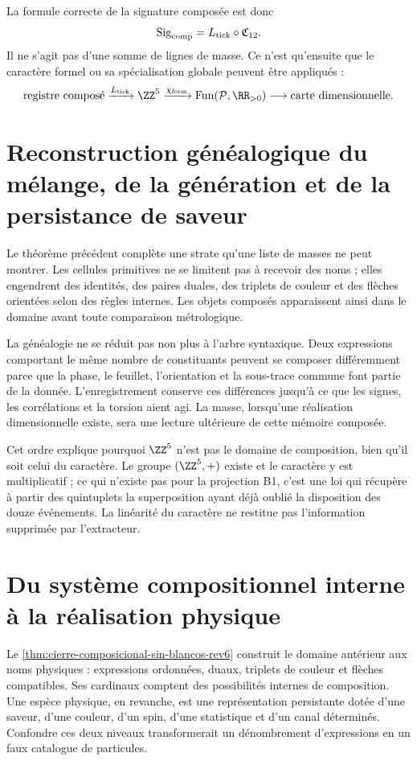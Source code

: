 La formule correcte de la signature composée est donc
\[
 \operatorname{Sig}_{\rm comp}
 =
 L_{\rm tick}\circ\mathfrak C_{12}.
\]
Il ne s’agit pas d’une somme de lignes de masse. Ce n’est qu’ensuite que le caractère formel ou sa spécialisation globale peuvent être appliqués :
\[
 \text{registre composé}
 \xrightarrow{L_{\rm tick}}\ZZ^5
 \xrightarrow{\chi_{\rm form}}\operatorname{Fun}(\mathcal P,\RR_{>0})
 \longrightarrow
 \text{carte dimensionnelle}.
\]

\section{Reconstruction généalogique du mélange, de la génération et de la persistance de saveur}
\label{sec:significado-genealogico-composicion-rev6}

Le théorème précédent complète une strate qu’une liste de masses ne peut montrer. Les cellules primitives ne se limitent pas à recevoir des noms ; elles engendrent des identités, des paires duales, des triplets de couleur et des flèches orientées selon des règles internes. Les objets composés apparaissent ainsi dans le domaine avant toute comparaison métrologique.

La généalogie ne se réduit pas non plus à l’arbre syntaxique. Deux expressions comportant le même nombre de constituants peuvent se composer différemment parce que la phase, le feuillet, l’orientation et la sous-trace commune font partie de la donnée. L’enregistrement conserve ces différences jusqu’à ce que les signes, les corrélations et la torsion aient agi. La masse, lorsqu’une réalisation dimensionnelle existe, sera une lecture ultérieure de cette mémoire composée.

Cet ordre explique pourquoi \(\ZZ^5\) n’est pas le domaine de composition, bien qu’il soit celui du caractère. Le groupe \((\ZZ^5,+)\) existe et le caractère y est multiplicatif ; ce qui n’existe pas pour la projection B1, c’est une loi qui récupère à partir des quintuplets la superposition ayant déjà oublié la disposition des douze événements. La linéarité du caractère ne restitue pas l’information supprimée par l’extracteur.

\section{Du système compositionnel interne à la réalisation physique}
\label{sec:delimitacion-composicion-especies-rev6}

Le \cref{thm:cierre-composicional-sin-blancos-rev6} construit le domaine antérieur aux noms physiques : expressions ordonnées, duaux, triplets de couleur et flèches compatibles. Ses cardinaux comptent des possibilités internes de composition. Une espèce physique, en revanche, est une représentation persistante dotée d’une saveur, d’une couleur, d’un spin, d’une statistique et d’un canal déterminés. Confondre ces deux niveaux transformerait un dénombrement d’expressions en un faux catalogue de particules.

